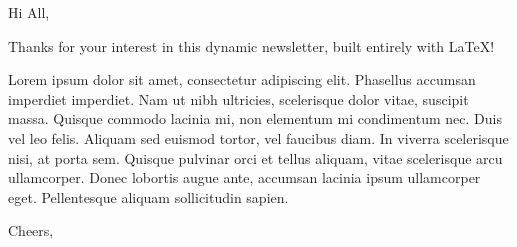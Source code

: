 \begin{page}%
	\Header[%
		title=\inserttitle,
		author=\insertauthor,
		tagline={A procedural \TeX{} newsletter template for professionals},
	]
	
	\Spacer[height=\nlmargin]
	
	\begin{AutoColumns}%
		\begin{Column}[width=0.4]%
			\begin{foreword}[%
				image=img/ep.jpg,
			]%
				Hi All, \newline
				
				Thanks for your interest in this dynamic newsletter, built entirely with \LaTeX{}! \newline
				
				Lorem ipsum dolor sit amet, consectetur adipiscing elit. Phasellus accumsan imperdiet imperdiet. Nam ut nibh ultricies, scelerisque dolor vitae, suscipit massa. Quisque commodo lacinia mi, non elementum mi condimentum nec. Duis vel leo felis. Aliquam sed euismod tortor, vel faucibus diam. In viverra scelerisque nisi, at porta sem. Quisque pulvinar orci et tellus aliquam, vitae scelerisque arcu ullamcorper. Donec lobortis augue ante, accumsan lacinia ipsum ullamcorper eget. Pellentesque aliquam sollicitudin sapien. \newline
				
				Cheers,
				

\end{foreword}
\end{Column}
\end{AutoColumns}
\end{page}

